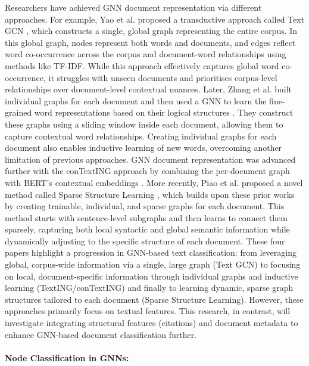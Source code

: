 \documentclass[10pt,oneside]{book}
\begin{document}
Researchers have achieved GNN document representation via different approaches. For example, Yao et al. proposed a transductive approach called Text GCN \cite{yao_graph_2018}, which constructs a single, global graph representing the entire corpus. In this global graph, nodes represent both words and documents, and edges reflect word co-occurrence across the corpus and document-word relationships using methods like TF-IDF. While this approach effectively captures global word co-occurrence, it struggles with unseen documents and prioritises corpus-level relationships over document-level contextual nuances. Later, Zhang et al. built individual graphs for each document and then used a GNN to learn the fine-grained word representations based on their logical structures \cite{zhang_evaluating_2020}. They construct these graphs using a sliding window inside each document, allowing them to capture contextual word relationships. Creating individual graphs for each document also enables inductive learning of new words, overcoming another limitation of previous approaches. GNN document representation was advanced further with the conTextING approach by combining the per-document graph with BERT's contextual embeddings \cite{huang_contexting_2022}. More recently, Piao et al. proposed a novel method called Sparse Structure Learning \cite{piao_sparse_2022}, which builds upon these prior works by creating trainable, individual, and sparse graphs for each document. This method starts with sentence-level subgraphs and then learns to connect them sparsely, capturing both local syntactic and global semantic information while dynamically adjusting to the specific structure of each document. These four papers highlight a progression in GNN-based text classification: from leveraging global, corpus-wide information via a single, large graph (Text GCN) to focusing on local, document-specific information through individual graphs and inductive learning (TextING/conTextING) and finally to learning dynamic, sparse graph structures tailored to each document (Sparse Structure Learning). However, these approaches primarily focus on textual features. This research, in contrast, will investigate integrating structural features (citations) and document metadata to enhance GNN-based document classification further.

\paragraph{Node Classification in GNNs: }
\end{document}
